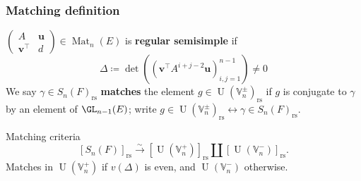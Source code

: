 \documentclass[11pt]{beamer}
\DeclareMathOperator{\Mat}{Mat}
\DeclareMathOperator{\Orb}{Orb}
\DeclareMathOperator{\U}{U}
\newcommand{\HH}{\mathcal{H}}
\newcommand{\VV}{\mathbb{V}}
\newcommand{\rs}{_{\text{rs}}}
\newcommand{\uu}{\mathbf{u}}
\newcommand{\vv}{\mathbf{v}}
\begin{document}
\begin{frame}
  \frametitle{Matching definition}
  \begin{definition}
  $\begin{pmatrix} A & \uu \\ \vv^\top & d \end{pmatrix} \in \Mat_n(E)$
  is \textbf{regular semisimple} if
  \[ \Delta \coloneqq \det \left( \left( \vv^\top A^{i+j-2} \uu \right)_{i,j=1}^{n-1} \right) \neq 0 \]
  We say $\gamma \in S_n(F)\rs$ \textbf{matches} the element $g \in \U(\VV_n^\pm)\rs$
  if $g$ is conjugate to $\gamma$ by an element of $\GL_{n-1}(E)$; write
  $g \in \U(\VV_n^\pm)\rs \longleftrightarrow \gamma \in S_n(F)\rs$.
  \end{definition}
  \begin{block}{Matching criteria}
    \[ [S_n(F)]\rs \xrightarrow{\sim} [\U(\VV_n^+)]\rs \amalg [\U(\VV_n^-)]\rs. \]
    Matches in $\U(\VV_n^+)$ if $v(\Delta)$ is even,
    and $\U(\VV_n^-)$ otherwise.
  \end{block}
\end{frame}

\end{document}
